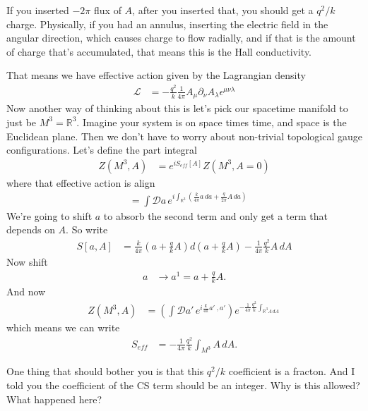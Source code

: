 If you inserted $-2\pi$ flux of $A$,
after you inserted that,
you should get a $q^2/k$ charge.
Physically,
if you had an annulus,
inserting the electric field in the angular direction,
which causes charge to flow radially,
and if that is the amount of charge that's accumulated,
that means this is the Hall conductivity.

That means we have effective action given by the Lagrangian density
\begin{align}
    \mathcal{L} &=
    - \frac{q^2}{k}
    \frac{1}{4\pi}
    A_\mu \partial_\nu A_\lambda \epsilon^{\mu\nu\lambda}
\end{align}
Now another way of thinking about this is let's pick our spacetime manifold to
just be $M^3 = \mathbb{R}^3$.
Imagine your system is on space times time,
and space is the Euclidean plane.
Then we don't have to worry about non-trivial topological gauge configurations.
Let's define the part integral
\begin{align}
    Z\left( M^3, A \right)
    &=
    e^{iS_{eff}[A]}
    Z\left( M^3, A=0 \right)
\end{align}
where that effective action is
align
\begin{align}
    &=
    \int \mathcal{D} a\,
    e^{
    i\int_{\mathbb{R}^3}
    \left( 
    \frac{k}{4\pi} a\,d a
    +
    \frac{q}{2\pi} A\, da
    \right)
    }
\end{align}
We're going to shift $a$ to absorb the second term and only get a term that
depends on $A$.
So write
\begin{align}
    S[a, A] &=
    \frac{k}{4\pi}
    \left( a + \frac{q}{k} A \right)
    d\left( 
    a + \frac{q}{k}A
    \right)
    -
    \frac{1}{4\pi}
    \frac{q^2}{k}
    A\, dA
\end{align}
Now shift
\begin{align}
    a &\to
    a^1 =
    a + \frac{q}{k}A.
\end{align}
And now
\begin{align}
    Z\left( M^3, A \right) &=
    \left( 
    \int \mathcal{D} a'\,
    e^{i \frac{k}{4\pi} a'\ , a'}
    \right)
    e^{-\frac{1}{4\pi} \frac{q^2}{k}
    \int_{\mathbb{R}^3 A\, dA}
    }
\end{align}
which means we can write
\begin{align}
    S_{eff} &=
    -\frac{1}{4\pi}
    \frac{q^2}{k}
    \int_{M^3}A\, dA.
\end{align}

One thing that should bother you is that this $q^2/k$ coefficient
is a fracton.
And I told you the coefficient of the CS term should be an integer.
Why is this allowed?
What happened here?


